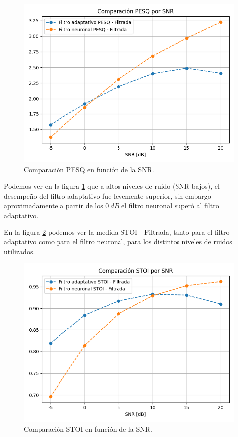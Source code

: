 \begin{figure}[h]
	\centering
	\centerline{\includegraphics[scale=0.75]{images/ch8/comparison_pesq_by_snr.png}}
	\caption{Comparación PESQ en función de la SNR.}
	\label{fig:ch8_pesq_comparison_by_snr}
\end{figure}

Podemos ver en la figura \ref{fig:ch8_pesq_comparison_by_snr} que a altos niveles de ruido (SNR bajos), el desempeño del filtro adaptativo fue levemente superior, sin embargo aproximadamente a partir de los $\SI{0}{dB}$ el filtro neuronal superó al filtro adaptativo.	

En la figura \ref{fig:ch8_stoi_comparison_by_snr} podemos ver la medida STOI - Filtrada, tanto para el filtro adaptativo como para el filtro neuronal, para los distintos niveles de ruidos utilizados.

\begin{figure}[H]
	\centering
	\centerline{\includegraphics[scale=0.75]{images/ch8/comparison_stoi_by_snr.png}}
	\caption{Comparación STOI en función de la SNR.}
	\label{fig:ch8_stoi_comparison_by_snr}
\end{figure}

